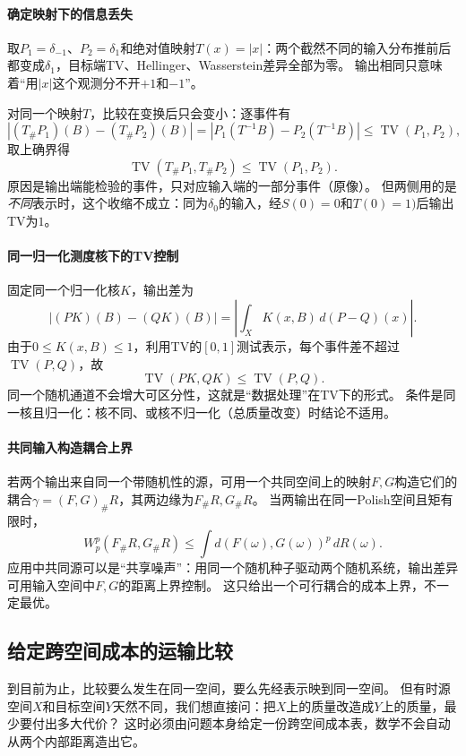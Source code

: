 \paragraph{确定映射下的信息丢失}

取$P_1=\delta_{-1}$、$P_2=\delta_1$和绝对值映射$T(x)=|x|$：两个截然不同的输入分布推前后都变成$\delta_1$，目标端TV、Hellinger、Wasserstein差异全部为零。
输出相同只意味着“用$|x|$这个观测分不开$+1$和$-1$”。

对同一个映射$T$，比较在变换后只会变小：逐事件有
\[
 |(T_\#P_1)(B)-(T_\#P_2)(B)|
 =|P_1(T^{-1}B)-P_2(T^{-1}B)|
 \leq\operatorname{TV}(P_1,P_2),
\]
取上确界得
\[
 \operatorname{TV}(T_\#P_1,T_\#P_2)\leq\operatorname{TV}(P_1,P_2).
\]
原因是输出端能检验的事件，只对应输入端的一部分事件（原像）。
但两侧用的是\emph{不同}表示时，这个收缩不成立：同为$\delta_0$的输入，经$S(0)=0$和$T(0)=1)$后输出TV为$1$。

\paragraph{同一归一化测度核下的TV控制}

固定同一个归一化核$K$，输出差为
\[
 |(PK)(B)-(QK)(B)|
 =\left|\int_XK(x,B)\,d(P-Q)(x)\right|.
\]
由于$0\leq K(x,B)\leq1$，利用TV的$[0,1]$测试表示，每个事件差不超过$\operatorname{TV}(P,Q)$，故
\[
 \operatorname{TV}(PK,QK)\leq\operatorname{TV}(P,Q).
\]
同一个随机通道不会增大可区分性，这就是“数据处理”在TV下的形式。
条件是同一核且归一化：核不同、或核不归一化（总质量改变）时结论不适用。

\paragraph{共同输入构造耦合上界}

若两个输出来自同一个带随机性的源，可用一个共同空间上的映射$F,G$构造它们的耦合$\gamma=(F,G)_\#R$，其两边缘为$F_\#R,G_\#R$。
当两输出在同一Polish空间且矩有限时，
\[
 W_p^p(F_\#R,G_\#R)
 \leq\int d(F(\omega),G(\omega))^p\,dR(\omega).
\]
应用中共同源可以是“共享噪声”：用同一个随机种子驱动两个随机系统，输出差异可用输入空间中$F,G$的距离上界控制。
这只给出一个可行耦合的成本上界，不一定最优。

\subsection{给定跨空间成本的运输比较}

到目前为止，比较要么发生在同一空间，要么先经表示映到同一空间。
但有时源空间$X$和目标空间$Y$天然不同，我们想直接问：把$X$上的质量改造成$Y$上的质量，最少要付出多大代价？
这时必须由问题本身给定一份跨空间成本表，数学不会自动从两个内部距离造出它。

